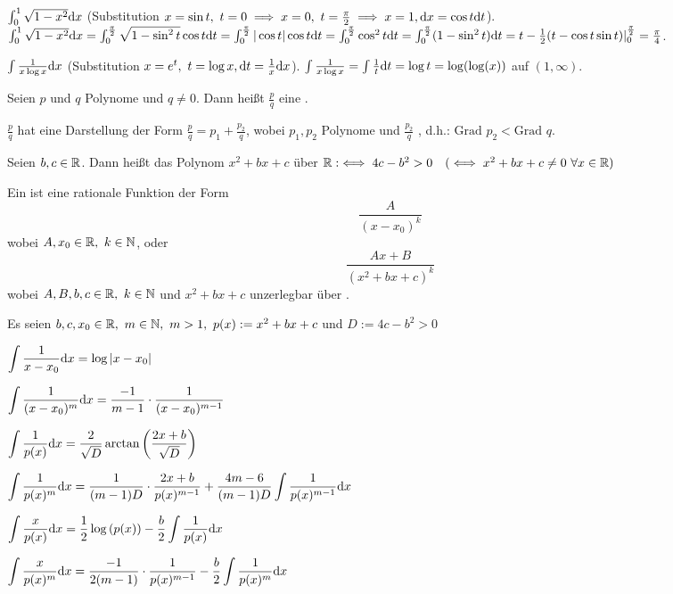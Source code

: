 \documentclass[a4paper,twoside,DIV15,BCOR12mm]{scrbook}
\begin{document}
\begin{beispiele}
\item $\int_0^1\sqrt{1-x^2}\text{d}x$ (Substitution $x=\sin t,\ t=0\folgt x=0,\ t=\frac{\pi}{2}\folgt x=1,\dx=\cos t\dt$). $\int_0^1\sqrt{1-x^2}\text{d}x=\int_0^{\frac{\pi}{2}}\sqrt{1-\sin^2 t}\cos t\text{d}t=\int_0^\frac{\pi}{2}|\cos t|\cos t\text{d}t=\int_0^{\frac{\pi}{2}}\cos^2t\text{d}t=\int_0^{\frac{\pi}{2}}(1-\sin^2t)\text{d}t=t-\frac{1}{2}(t-\cos t\sin t)|_0^{\frac{\pi}{2}}=\frac{\pi}{4}$.
\item $\int\frac{1}{x\log x}\text{d}x$ (Substitution $x=e^t,\ t=\log x,\text{d}t=\frac{1}{x}\text{d}x$). $\int\frac{1}{x\log x}=\int\frac{1}{t}\text{d}t=\log t=\log(\log(x))$ auf $(1,\infty)$.
\end{beispiele}

\begin{definition}
\begin{liste}
\item Seien $p$ und $q$ Polynome und $q \neq 0.$ Dann heißt $\frac{p}{q}$ eine .

$\frac{p}{q}$ hat eine Darstellung der Form $\frac{p}{q} = p_1 + \frac{p_2}{q}$, wobei $p_1,p_2$ Polynome und $\frac{p_2}{q}$ , d.h.: $\text{Grad } p_2 < \text{Grad } q$.

\item Seien $b,c \in \mathbb{R}$. Dann heißt das Polynom $x^2+bx+c$  über $\mathbb{R} :\iff 4c-b^2 > 0\quad(\iff x^2+bx+c \ne 0\ \forall x \in \mathbb{R})$

\item Ein  ist eine rationale Funktion der Form $$\frac{A}{(x-x_0)^k}$$wobei $A,x_0 \in \mathbb{R},\ k \in \mathbb{N}$, oder $$\frac{Ax+B}{(x^2+bx+c)^k}$$wobei $A,B,b,c \in \mathbb{R},\ k \in \mathbb{N}$ und $x^2+bx+c$ unzerlegbar über \MdR.
\end{liste}
\end{definition}

\newcommand{\fint}[2]{\int{\frac{#1}{#2}\dx}}

\begin{satz}
Es seien $b,c,x_0 \in \mathbb{R},\ m \in \mathbb{N},\ m > 1,\ p(x) := x^2+bx+c$ und $D := 4c-b^2 > 0$
\begin{liste}
\item $\displaystyle{\fint{1}{x-x_0} = \log{|x-x_0|}}$
\item $\displaystyle{\fint{1}{(x-x_0)^m} = \frac{-1}{m-1} \cdot \frac{1}{(x-x_0)^{m-1}}}$
\item $\displaystyle{\fint{1}{p(x)} = \frac{2}{\sqrt{D}} \arctan{\left( \frac{2x+b}{\sqrt{D}} \right)}}$
\item $\displaystyle{\fint{1}{p(x)^m} = \frac{1}{(m-1)D} \cdot \frac{2x+b}{p(x)^{m-1}} + \frac{4m-6}{(m-1)D} \fint{1}{p(x)^{m-1}}}$
\item $\displaystyle{\fint{x}{p(x)} = \frac{1}{2} \log{(p(x))} - \frac{b}{2} \fint{1}{p(x)}}$
\item $\displaystyle{\fint{x}{p(x)^m} = \frac{-1}{2(m-1)} \cdot \frac{1}{p(x)^{m-1}} - \frac{b}{2} \fint{1}{p(x)^m}}$
\end{liste}
\end{satz}
\end{document}
